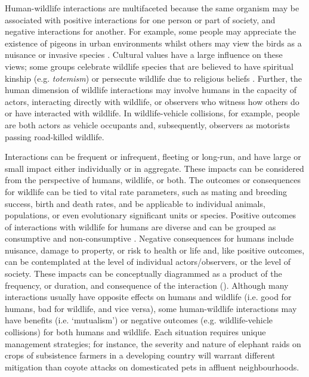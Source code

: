 Human-wildlife interactions are multifaceted because the same organism may be associated with positive interactions for one person or part of society, and negative interactions for another. For example, some people may appreciate the existence of pigeons in urban environments whilst others may view the birds as a nuisance or invasive species \citep{harr16}. Cultural values have a large influence on these views; some groups celebrate wildlife species that are believed to have spiritual kinship (e.g. \textit{totemism}) or persecute wildlife due to religious beliefs \citep[e.g. killing of Aye-ayes on sight in Madagascar, see][]{hill10}. Further, the human dimension of wildlife interactions may involve humans in the capacity of actors, interacting directly with wildlife, or observers who witness how others do or have interacted with wildlife. In wildlife-vehicle collisions, for example, people are both actors as vehicle occupants and, subsequently, observers as motorists passing road-killed wildlife.

Interactions can be frequent or infrequent, fleeting or long-run, and have large or small impact either individually or in aggregate. These impacts can be considered from the perspective of humans, wildlife, or both. The outcomes or consequences for wildlife can be tied to vital rate parameters, such as mating and breeding success, birth and death rates, and be applicable to individual animals, populations, or even evolutionary significant units or species. Positive outcomes of interactions with wildlife for humans are diverse and can be grouped as consumptive and non-consumptive \citep{char02}. Negative consequences for humans include nuisance, damage to property, or risk to health or life and, like positive outcomes, can be contemplated at the level of individual actors/observers, or the level of society. These impacts can be conceptually diagrammed as a product of the frequency, or duration, and consequence of the interaction (). Although many interactions usually have opposite effects on humans and wildlife (i.e. good for humans, bad for wildlife, and vice versa), some human-wildlife interactions may have benefits (i.e. `mutualism') or negative outcomes (e.g. wildlife-vehicle collisions) for both humans and wildlife. Each situation requires unique management strategies; for instance, the severity and nature of elephant raids on crops of subsistence farmers in a developing country will warrant different mitigation than coyote attacks on domesticated pets in affluent neighbourhoods. 

